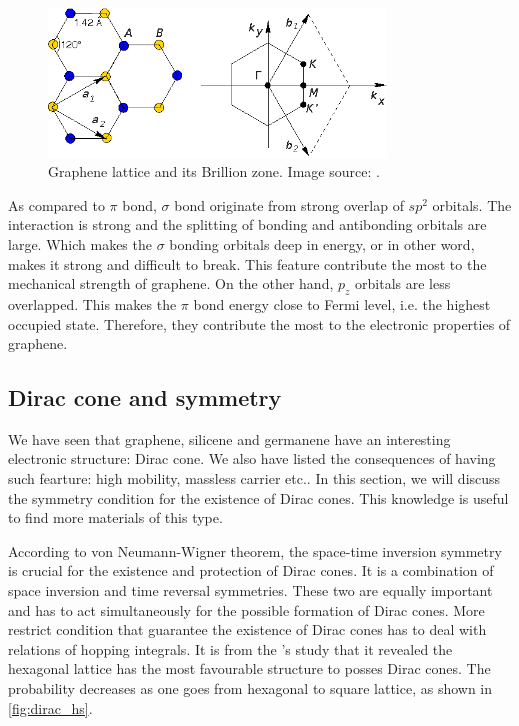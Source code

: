 \begin{figure}[htbp!] 
\centering  
\includegraphics[width=0.8\textwidth]{gra_lat.eps}
\caption{Graphene lattice and its Brillion zone. Image source: \cite{CastroNeto2009}. }  
\label{fig:gra_lat}
\end{figure} 

As compared to $\pi$ bond, $\sigma$ bond originate from strong overlap of $sp^2$ orbitals. The interaction is strong and the splitting of bonding and antibonding orbitals are large. Which makes the $\sigma$ bonding orbitals deep in energy, or in other word, makes it strong and difficult to break. This feature contribute the most to the mechanical strength of graphene. On the other hand, $p_z$ orbitals are less overlapped. This makes the $\pi$ bond energy close to Fermi level, i.e. the highest occupied state. Therefore, they contribute the most to the electronic properties of graphene.  


\subsection{Dirac cone and symmetry}

We have seen that graphene, silicene and germanene have an interesting electronic structure: Dirac cone. We also have listed the consequences of having such fearture: high mobility, massless carrier etc.. In this section, we will discuss the symmetry condition for the existence of Dirac cones. This knowledge is useful to find more materials of this type. 

According to von Neumann-Wigner theorem, the space-time inversion symmetry is crucial for the existence and protection of Dirac cones\cite{Wang2015b}. It is a combination of space inversion and time reversal symmetries. These two are equally important and has to act simultaneously for the possible formation of Dirac cones. More restrict condition that guarantee the existence of Dirac cones has to deal with relations of hopping integrals\cite{Hasegawa2006,Liu2013}. It is from the \citet{Liu2013}'s study that it revealed the hexagonal lattice has the most favourable structure to posses Dirac cones. The probability decreases as one goes from hexagonal to square lattice, as shown in \autoref{fig:dirac_hs}.

